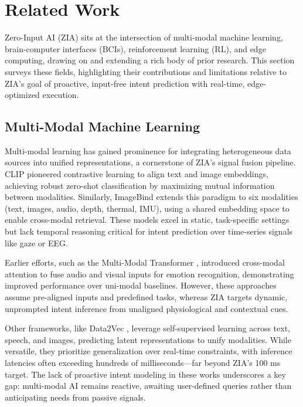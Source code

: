 \section{Related Work}
Zero-Input AI (ZIA) sits at the intersection of multi-modal machine learning, brain-computer interfaces (BCIs), reinforcement learning (RL), and edge computing, drawing on and extending a rich body of prior research. This section surveys these fields, highlighting their contributions and limitations relative to ZIA's goal of proactive, input-free intent prediction with real-time, edge-optimized execution.

\subsection{Multi-Modal Machine Learning}
Multi-modal learning has gained prominence for integrating heterogeneous data sources into unified representations, a cornerstone of ZIA's signal fusion pipeline. CLIP \cite{radford2021learning} pioneered contrastive learning to align text and image embeddings, achieving robust zero-shot classification by maximizing mutual information between modalities. Similarly, ImageBind \cite{girdhar2023imagebind} extends this paradigm to six modalities (text, images, audio, depth, thermal, IMU), using a shared embedding space to enable cross-modal retrieval. These models excel in static, task-specific settings but lack temporal reasoning critical for intent prediction over time-series signals like gaze or EEG. 

Earlier efforts, such as the Multi-Modal Transformer \cite{tsai2019multimodal}, introduced cross-modal attention to fuse audio and visual inputs for emotion recognition, demonstrating improved performance over uni-modal baselines. However, these approaches assume pre-aligned inputs and predefined tasks, whereas ZIA targets dynamic, unprompted intent inference from unaligned physiological and contextual cues.

Other frameworks, like Data2Vec \cite{baevski2022data2vec}, leverage self-supervised learning across text, speech, and images, predicting latent representations to unify modalities. While versatile, they prioritize generalization over real-time constraints, with inference latencies often exceeding hundreds of milliseconds—far beyond ZIA's 100 ms target. The lack of proactive intent modeling in these works underscores a key gap: multi-modal AI remains reactive, awaiting user-defined queries rather than anticipating needs from passive signals.

